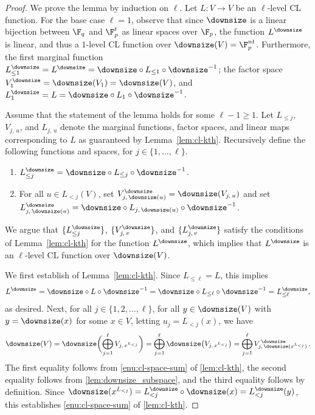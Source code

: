 \begin{proof}
  We prove the lemma by induction on $\ell$.
  Let $L:V \to V$ be an $\ell$-level CL function.
  For the base case $\ell = 1$, observe that since $\downsize$ is a linear
  bijection between $\F_q$ and $\F_p^t$ as linear spaces over $\F_p$, the
  function $L^\downsize$ is linear, and thus a $1$-level CL function over
  $\downsize(V) = \F_p^{nt}$.
  Furthermore, the first marginal function $L^\downsize_{\leq 1} = L^\downsize =
  \downsize \circ L_{\leq 1} \circ \downsize^{-1}$; the factor space
  $V^\downsize_1 = \downsize(V_1) = \downsize(V)$, and $L^\downsize_1 = L =
  \downsize \circ L_1 \circ \downsize^{-1}$.

  Assume that the statement of the lemma holds for some $\ell - 1 \geq 1$.
  Let $L_{\leq j}$, $V_{j,\, u}$, and $L_{j,\, u}$ denote the marginal
  functions, factor spaces, and linear maps corresponding to $L$ as guaranteed
  by Lemma~\ref{lem:cl-kth}.
  Recursively define the following functions and spaces, for $j \in
  \{1,\ldots,\ell\}$.
  \begin{enumerate}
	\item $L^\downsize_{\leq j} = \downsize \circ L_{\leq j} \circ
    \downsize^{-1}$.
	\item For all $u \in L_{<j} (V)$, set $V_{j,\, \downsize(u)}^\downsize =
    \downsize(V_{j,\, u})$ and set $L_{j,\, \downsize(u)}^\downsize = \downsize
    \circ L_{j,\,\downsize( u)} \circ \downsize^{-1}$.
  \end{enumerate}
  We argue that $\{L^\downsize_{\leq j}\}$, $\{V^\downsize_{j,\, v}\}$, and
  $\{L_{j,\, v}^\downsize \}$ satisfy the conditions of Lemma~\ref{lem:cl-kth}
  for the function $L^\downsize$, which implies that $L^\downsize$ is an
  $\ell$-level CL function over $\downsize(V)$.

  We first establish  of Lemma~\ref{lem:cl-kth}.
  Since $L_{\leq \ell} = L$, this implies
  \begin{equation*}
	  L^\downsize = \downsize \circ L \circ \downsize^{-1}
    = \downsize \circ L_{\leq \ell} \circ \downsize^{-1}
    = L^{\downsize}_{\leq \ell},
  \end{equation*}
  as desired.
  Next, for all $j \in \{1, 2, \ldots, \ell\}$, for all $y \in \downsize(V)$
  with $y = \downsize(x)$ for some $x \in V$, letting $u_j = L_{<j}(x)$, we have
  \begin{equation*}
	  \downsize(V) = \downsize \biggl ( \bigoplus_{j=1}^\ell V_{j,\, \smash{x^{L_{<j}}}} \biggr)
    = \bigoplus_{j=1}^\ell \downsize \bigl( V_{j,\, \smash{x^{L_{<j}}}} \bigr)
    = \bigoplus_{j=1}^\ell V^{\,\downsize}_{j,\, \smash{\downsize(x^{L_{<j}})}}\,.
  \end{equation*}
  The first equality follows from \cref{enu:cl-space-sum} of \cref{lem:cl-kth},
  the second equality follows from \cref{lem:downsize_subspace}, and the third
  equality follows by definition.
  Since $\downsize(x^{L_{<j}}) = L^\downsize_{<j} \circ \downsize (x) =
  L^\downsize_{<j} (y)$, this establishes \cref{enu:cl-space-sum} of
  \cref{lem:cl-kth}.


\end{proof}
